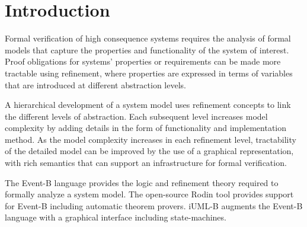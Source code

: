 
\section{Introduction}
\label{sec:introduction}

Formal verification of high consequence systems 
requires the analysis of formal models that capture  
the properties and functionality of the system of 
interest. Proof obligations for systems' 
properties or requirements can be made more tractable 
using refinement, where properties are expressed in terms of variables that 
are introduced at different abstraction levels.  

A hierarchical development of a system model uses 
refinement concepts to link the different levels
of abstraction. Each subsequent level increases model 
complexity by adding details in the form of functionality and 
implementation method. As the model complexity increases 
in each refinement level, tractability of the detailed 
model can be improved by the use of a graphical representation, 
with rich semantics that can support an infrastructure 
for formal verification.

The Event-B language \cite{abrial10:_model_event_b} provides the logic and refinement
theory required to formally analyze a system model. 
The open-source Rodin tool \cite{abrial10:_rodin} provides support for Event-B including automatic theorem provers.
iUML-B \cite{snook14:_b_statem} augments the Event-B language with a graphical interface including state-machines.
 
